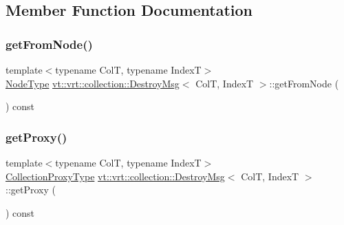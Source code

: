 \subsection{Member Function Documentation}
\mbox{\label{structvt_1_1vrt_1_1collection_1_1_destroy_msg_a598fc97dc1277e545b741e1272da588c}} 
\subsubsection{\texorpdfstring{get\+From\+Node()}{getFromNode()}}
{\footnotesize\ttfamily template$<$typename ColT, typename IndexT$>$ \\
\hyperlink{namespacevt_a866da9d0efc19c0a1ce79e9e492f47e2}{Node\+Type} \hyperlink{structvt_1_1vrt_1_1collection_1_1_destroy_msg}{vt\+::vrt\+::collection\+::\+Destroy\+Msg}$<$ ColT, IndexT $>$\+::get\+From\+Node (\begin{DoxyParamCaption}{ }\end{DoxyParamCaption}) const\hspace{0.3cm}{\ttfamily [inline]}}

\mbox{\label{structvt_1_1vrt_1_1collection_1_1_destroy_msg_a57e8fd346b3298e9472cccbda65ed1d8}} 
\subsubsection{\texorpdfstring{get\+Proxy()}{getProxy()}}
{\footnotesize\ttfamily template$<$typename ColT, typename IndexT$>$ \\
\hyperlink{structvt_1_1vrt_1_1collection_1_1_destroy_msg_a5bf089cacadf94e55e9ae797c4cd0462}{Collection\+Proxy\+Type} \hyperlink{structvt_1_1vrt_1_1collection_1_1_destroy_msg}{vt\+::vrt\+::collection\+::\+Destroy\+Msg}$<$ ColT, IndexT $>$\+::get\+Proxy (\begin{DoxyParamCaption}{ }\end{DoxyParamCaption}) const\hspace{0.3cm}{\ttfamily [inline]}}

